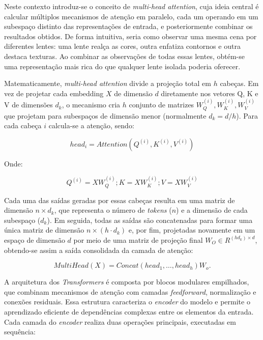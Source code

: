 Neste contexto introduz-se o conceito de \textit{multi-head attention}, cuja ideia central é calcular múltiplos mecanismos de atenção em paralelo, cada um operando em um subespaço distinto das representações de entrada, e posteriormente combinar os resultados obtidos. De forma intuitiva, seria como observar uma mesma cena por diferentes lentes: uma lente realça as cores, outra enfatiza contornos e outra destaca texturas. Ao combinar as observações de todas essas lentes, obtém-se uma representação mais rica do que qualquer lente isolada poderia oferecer.

Matematicamente, \textit{multi-head attention} divide a projeção total em $h$ cabeças. Em vez de projetar cada embedding $X$ de dimensão $d$ diretamente nos vetores Q, K e V de dimensões $d_k$, o mecanismo cria $h$ conjunto de matrizes $W^{(i)}_Q, W^{(i)}_K, W^{(i)}_V$ que projetam para subespaços de dimensão menor (normalmente $d_k = d/h$). Para cada cabeça $i$ calcula-se a atenção, sendo:

\begin{equation}
    head_i = Attention(Q^{(i)}, K^{(i)}, V^{(i)})
\end{equation}

\begin{center}
    Onde:
\end{center}

\begin{equation}
    Q^{(i)} = XW^{(i)}_Q; K = XW^{(i)}_K; V = XW^{(i)}_V
\end{equation}

Cada uma das saídas geradas por essas cabeças resulta em uma matriz de dimensão $n \times d_k$, que representa o número de \textit{tokens} ($n$) e a dimensão de cada subespaço ($d_k$). Em seguida, todas as saídas são concatenadas para formar uma única matriz de dimensão $n \times (h \cdot d_k)$ e, por fim, projetadas novamente em um espaço de dimensão $d$ por meio de uma matriz de projeção final $W_O \in R^{(h d_k) \times d}$, obtendo-se assim a saída consolidada da camada de atenção:

\begin{equation}
    MultiHead(X) = Concat(head_1,\ldots,head_h)W_o.
\end{equation}

A arquitetura dos \textit{Transformers} é composta por blocos modulares empilhados, que combinam mecanismos de atenção com camadas \textit{feedforward}, normalização e conexões residuais. Essa estrutura caracteriza o \textit{encoder} do modelo e permite o aprendizado eficiente de dependências complexas entre os elementos da entrada. Cada camada do \textit{encoder} realiza duas operações principais, executadas em sequência:

